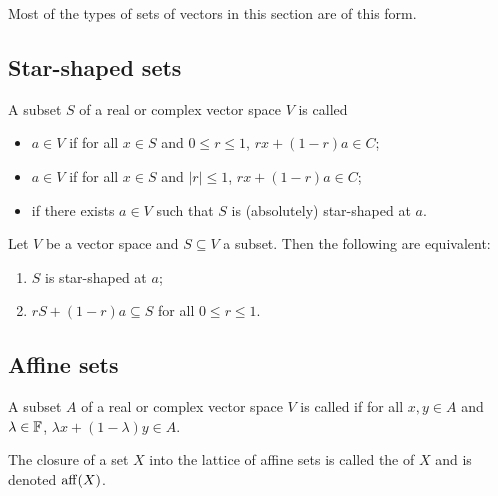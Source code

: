Most of the types of sets of vectors in this section are of this form.

\subsection{Star-shaped sets}
\begin{definition}
A subset $S$ of a real or complex vector space $V$ is called
\begin{itemize}
\item {} $a\in V$ if for all $x\in S$ and $0\leq r \leq 1$, $rx + (1-r)a\in C$;
\item {} $a\in V$ if for all $x\in S$ and $|r| \leq 1$, $rx + (1-r)a\in C$;
\item {} if there exists $a\in V$ such that $S$ is (absolutely) star-shaped at $a$.
\end{itemize}
\end{definition}

\begin{lemma}
Let $V$ be a vector space and $S\subseteq V$ a subset. Then the following are equivalent:
\begin{enumerate}
\item $S$ is star-shaped at $a$;
\item $r S + (1-r)a \subseteq S$ for all $0\leq r \leq 1$.
\end{enumerate}
\end{lemma}

\subsection{Affine sets}
\begin{definition}
A subset $A$ of a real or complex vector space $V$ is called  if for all $x,y\in A$ and $\lambda\in\mathbb{F}$, $\lambda x + (1-\lambda)y\in A$.

The closure of a set $X$ into the lattice of affine sets is called the  of $X$ and is denoted $\operatorname{aff}(X)$.
\end{definition}

